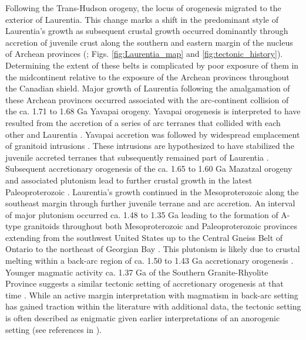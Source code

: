 \documentclass[11pt,letterpaper]{article}
\begin{document}
Following the Trans-Hudson orogeny, the locus of orogenesis migrated to the exterior of Laurentia. This change marks a shift in the predominant style of Laurentia's growth as subsequent crustal growth occurred dominantly through accretion of juvenile crust along the southern and eastern margin of the nucleus of Archean provinces (\citealp{Whitmeyer2007a}; Figs. \ref{fig:Laurentia_map} and \ref{fig:tectonic_history}). Determining the extent of these belts is complicated by poor exposure of them in the midcontinent relative to the exposure of the Archean provinces throughout the Canadian shield. Major growth of Laurentia following the amalgamation of these Archean provinces occurred associated with the arc-continent collision of the ca. 1.71 to 1.68 Ga Yavapai orogeny. Yavapai orogenesis is interpreted to have resulted from the accretion of a series of arc terranes that collided with each other and Laurentia \citep{Karlstrom2001a}. Yavapai accretion was followed by widespread emplacement of granitoid intrusions \citep{Whitmeyer2007a}. These intrusions are hypothesized to have stabilized the juvenile accreted terranes that subsequently remained part of Laurentia \citep{Whitmeyer2007a}. Subsequent accretionary orogenesis of the ca. 1.65 to 1.60 Ga Mazatzal orogeny and associated plutonism lead to further crustal growth in the latest Paleoproterozoic \citep{Karlstrom1988a}. Laurentia's growth continued in the Mesoproterozoic along the southeast margin through further juvenile terrane and arc accretion. An interval of major plutonism occurred ca. 1.48 to 1.35 Ga leading to the formation of A-type granitoids throughout both Mesoproterozoic and Paleoproterozoic provinces extending from the southwest United States up to the Central Gneiss Belt of Ontario to the northeast of Georgian Bay \citep{Slagstad2009a}. This plutonism is likely due to crustal melting within a back-arc region of ca. 1.50 to 1.43 Ga accretionary orogenesis \citep{Bickford2015a}. Younger magmatic activity ca. 1.37 Ga of the Southern Granite-Rhyolite Province suggests a similar tectonic setting of accretionary orogenesis at that time \citep{Bickford2015a}. While an active margin interpretation with magmatism in back-arc setting has gained traction within the literature with additional data, the tectonic setting is often described as enigmatic given earlier interpretations of an anorogenic setting (see references in \citealp{Slagstad2009a}). 
\end{document}
